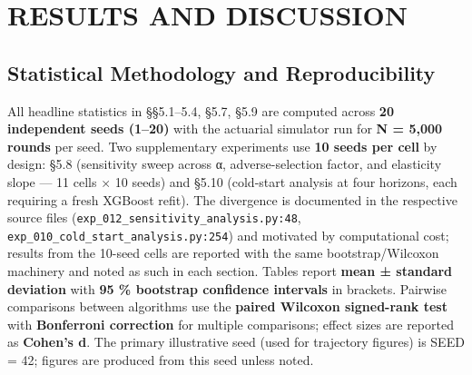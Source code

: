 \chapter{RESULTS AND DISCUSSION}\label{chapter-v.-results-and-discussion}

\setcounter{section}{-1}

\section{Statistical Methodology and Reproducibility}\label{statistical-methodology-and-reproducibility}

All headline statistics in §§5.1--5.4, §5.7, §5.9 are computed across \textbf{20 independent seeds (1--20)} with the actuarial simulator run for \textbf{N = 5,000 rounds} per seed. Two supplementary experiments use \textbf{10 seeds per cell} by design: §5.8 (sensitivity sweep across α, adverse-selection factor, and elasticity slope --- 11 cells × 10 seeds) and §5.10 (cold-start analysis at four horizons, each requiring a fresh XGBoost refit). The divergence is documented in the respective source files (\texttt{exp\_012\_sensitivity\_analysis.py:48}, \texttt{exp\_010\_cold\_start\_analysis.py:254}) and motivated by computational cost; results from the 10-seed cells are reported with the same bootstrap/Wilcoxon machinery and noted as such in each section. Tables report \textbf{mean ± standard deviation} with \textbf{95 \% bootstrap confidence intervals} in brackets. Pairwise comparisons between algorithms use the \textbf{paired Wilcoxon signed-rank test} with \textbf{Bonferroni correction} for multiple comparisons; effect sizes are reported as \textbf{Cohen's d}. The primary illustrative seed (used for trajectory figures) is SEED = 42; figures are produced from this seed unless noted.

